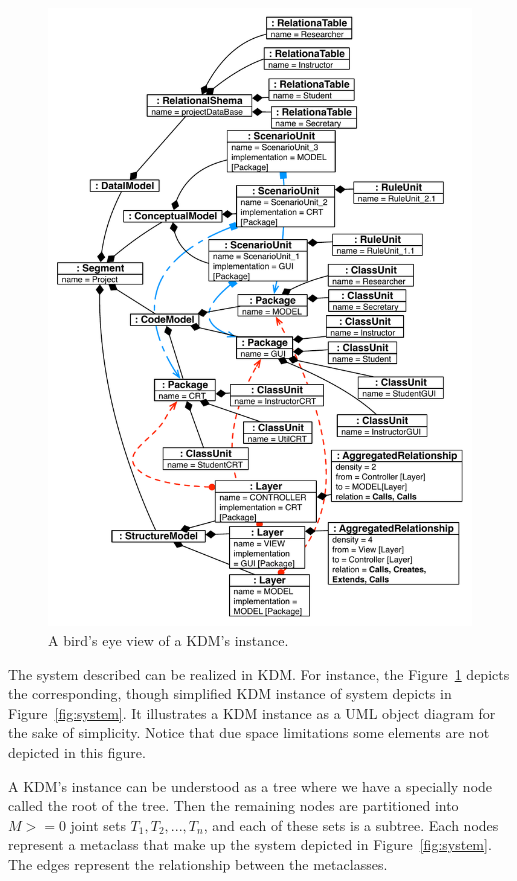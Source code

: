 \begin{figure}
	\centering
	\includegraphics[scale=0.52]{figuras/TreeNewJoint}
	\caption{A bird's eye view of a KDM's instance.}
	\label{fig:allKDMLayers}
\end{figure}

The system described can be realized in KDM. For instance, the Figure~\ref{fig:allKDMLayers} depicts the corresponding, though simplified KDM instance of system depicts in Figure~\ref{fig:system}. It illustrates a KDM instance as a UML object diagram for the sake of simplicity. Notice that due space limitations some elements are not depicted in this figure.

A KDM's instance can be understood as a tree where we have a specially node called the root of the tree. Then the remaining nodes are partitioned into $\textit{M} >= 0$ joint sets $T_{1}, T_{2}, ..., T_{n}$, and each of these sets is a subtree.  Each nodes represent a metaclass that make up the system depicted in Figure~\ref{fig:system}. The edges represent the relationship between the metaclasses.


